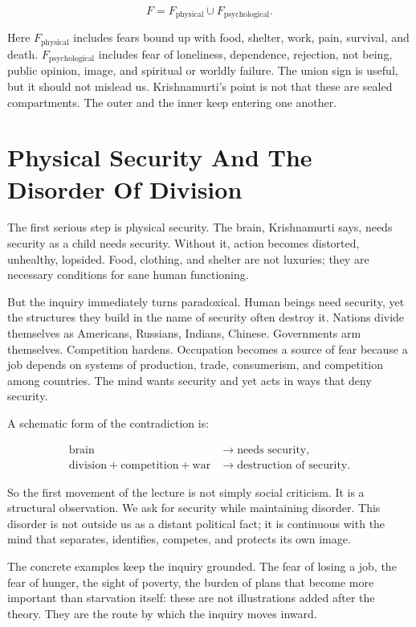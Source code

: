 \begin{equation}
F = F_{\mathrm{physical}} \cup F_{\mathrm{psychological}}.
\end{equation}

Here \(F_{\mathrm{physical}}\) includes fears bound up with food, shelter, work, pain, survival, and death. \(F_{\mathrm{psychological}}\) includes fear of loneliness, dependence, rejection, not being, public opinion, image, and spiritual or worldly failure. The union sign is useful, but it should not mislead us. Krishnamurti's point is not that these are sealed compartments. The outer and the inner keep entering one another.

\section{Physical Security And The Disorder Of Division}

The first serious step is physical security. The brain, Krishnamurti says, needs security as a child needs security. Without it, action becomes distorted, unhealthy, lopsided. Food, clothing, and shelter are not luxuries; they are necessary conditions for sane human functioning.

But the inquiry immediately turns paradoxical. Human beings need security, yet the structures they build in the name of security often destroy it. Nations divide themselves as Americans, Russians, Indians, Chinese. Governments arm themselves. Competition hardens. Occupation becomes a source of fear because a job depends on systems of production, trade, consumerism, and competition among countries. The mind wants security and yet acts in ways that deny security.

A schematic form of the contradiction is:

\begin{align}
\text{brain} &\longrightarrow \text{needs security}, \\
\text{division} + \text{competition} + \text{war} &\longrightarrow \text{destruction of security}.
\end{align}

So the first movement of the lecture is not simply social criticism. It is a structural observation. We ask for security while maintaining disorder. This disorder is not outside us as a distant political fact; it is continuous with the mind that separates, identifies, competes, and protects its own image.

The concrete examples keep the inquiry grounded. The fear of losing a job, the fear of hunger, the sight of poverty, the burden of plans that become more important than starvation itself: these are not illustrations added after the theory. They are the route by which the inquiry moves inward.

